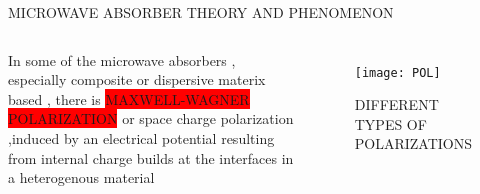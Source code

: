 \documentclass[11pt,aspect ratio=169]{beamer}
\begin{document}
\begin{frame}[t,allowframebreaks]{MICROWAVE ABSORBER THEORY AND PHENOMENON}
\begin{columns}
		
		
		
		\small In some of the microwave absorbers , especially composite or dispersive materix based , there is \colorbox{red}{MAXWELL-WAGNER POLARIZATION} or space charge polarization ,induced by an electrical potential resulting from internal charge builds at the interfaces in a heterogenous material\cite{13}
		
		
		\begin{figure}
			\tiny
			\texttt{[image: POL]}
			\caption{\tiny DIFFERENT TYPES OF POLARIZATIONS\protect \cite{booke}}
			\label{fig:pol}
		\end{figure}
		
	\end{columns}
\end{frame}
\end{document}
